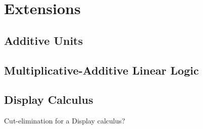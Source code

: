 \section{Extensions}\label{sec:mav-extensions}

\subsection{Additive Units}

\subsection{Multiplicative-Additive Linear Logic}

\subsection{Display Calculus}

Cut-elimination for a Display calculus?
